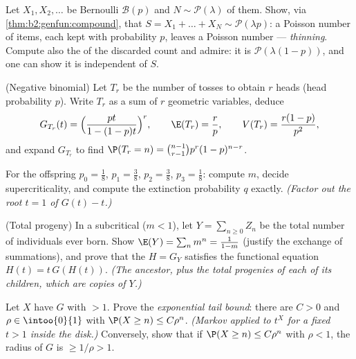 \begin{exercise}[$\star\star$]\label{exo:b2:genfun:4}
Let $X_1, X_2, \dots$ be  Bernoulli $\mathcal{B}(p)$
and $N \sim \mathcal{P}(\lambda)$  of them. Show,
via \cref{thm:b2:genfun:compound}, that $S = X_1 + \dots + X_N
\sim \mathcal{P}(\lambda p)$: a Poisson number of items, each kept
with probability $p$, leaves a Poisson number --- \emph{thinning}.
Compute also the  of the discarded count and admire: it is
$\mathcal{P}(\lambda(1-p))$, and one can show it is independent
of $S$.
\end{exercise}

\begin{exercise}[$\star\star$]\label{exo:b2:genfun:5}
(Negative binomial) Let $T_r$ be the number of tosses to obtain
$r$ heads (head probability $p$). Write $T_r$ as a sum of $r$
 geometric variables, deduce
\[
G_{T_r}(t) = \Bigl(\frac{pt}{1 - (1-p)t}\Bigr)^{r},
\qquad
\E(T_r) = \frac rp,
\qquad
V(T_r) = \frac{r(1-p)}{p^2},
\]
and expand $G_{T_r}$ to find $\P(T_r = n) = \binom{n-1}{r-1}
p^r(1-p)^{n-r}$.
\end{exercise}

\begin{exercise}[$\star\star$]\label{exo:b2:genfun:6}
For the offspring  $p_0 = \frac18$, $p_1 = \frac38$, $p_2 =
\frac38$, $p_3 = \frac18$: compute $m$, decide
supercriticality, and compute the extinction probability $q$
exactly. \emph{(Factor out the root $t = 1$ of $G(t) - t$.)}
\end{exercise}

\begin{exercise}[$\star\star\star$]\label{exo:b2:genfun:7}
(Total progeny) In a subcritical  ($m < 1$), let
$Y = \sum_{n\geq0} Z_n$ be the total number of individuals ever
born. Show $\E(Y) = \sum_n m^n = \frac{1}{1 - m}$ (justify the
exchange of summations), and prove that the 
$H = G_Y$ satisfies the functional equation $H(t) = t\,G(H(t))$.
\emph{(The ancestor, plus the total progenies of each of its
children, which are  copies of $Y$.)}
\end{exercise}

\begin{exercise}[$\star\star\star$]\label{exo:b2:genfun:8}
Let $X$ have  $G$ with  $>
1$. Prove the \emph{exponential tail bound}: there are $C > 0$ and
$\rho \in \intoo{0}{1}$ with $\P(X \geq n) \leq C\rho^n$.
\emph{(Markov applied to $t^X$ for a fixed $t > 1$ inside the
disk.)} Conversely, show that if $\P(X \geq n) \leq C\rho^n$ with
$\rho < 1$, the radius of $G$ is $\geq 1/\rho > 1$.
\end{exercise}


